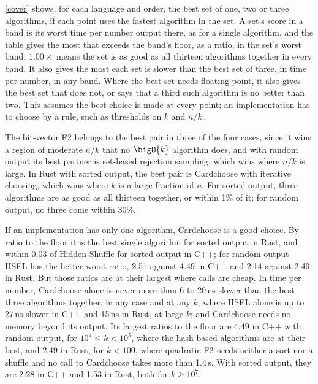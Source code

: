 \documentclass[letterpaper,11pt]{article}
\begin{document}
\autoref{cover} shows, for each language and
order, the best set of one, two or three algorithms, if each point uses
the fastest algorithm in the set. A set's score in a band is its worst
time per number output there, as for a single algorithm, and the table
gives the most that exceeds the band's floor, as a ratio, in the set's
worst band: \(1.00\times\) means the set is as good as all thirteen
algorithms together in every band. It also gives the most each set is
slower than the best set of three, in time per number, in any band.
Where the best set needs floating point, it also gives the best set
that does not, or says that a third such algorithm is no better than
two. This assumes the best choice is made at every point; an
implementation has to choose by a rule, such as thresholds on \(k\)
and \(n/k\).

\begin{table}
    \small
    
    \caption{The best sets of up to three algorithms, by how far their
    worst time per number output in a band of \(k\) exceeds the band's
    floor in their worst band, with the most they are slower than the
    best three in any band}\label{cover}
\end{table}

The bit-vector F2 belongs to the best pair in three of the four cases,
since it wins a region of moderate \(n/k\) that no \(\bigO{k}\)
algorithm does, and with random output its best partner is set-based
rejection sampling, which wins where \(n/k\) is large. In Rust with
sorted output, the best pair is Cardchoose with iterative choosing,
which wins where \(k\) is a large fraction of \(n\). For sorted output,
three algorithms are as good as all thirteen together, or within 1\% of
it; for random output, no three come within 30\%.

If an implementation has only one algorithm, Cardchoose is a good
choice. By ratio to the floor it is the best single algorithm for
sorted output in Rust, and within 0.03 of Hidden Shuffle for sorted
output in C++; for random output HSEL has the better worst ratio, 2.51
against 4.49 in C++ and 2.14 against 2.49 in Rust. But those ratios are
at their largest where calls are cheap. In time per number, Cardchoose
alone is never more than 6 to 20\,ns slower than the best three
algorithms together, in any case and at any \(k\), where HSEL alone is
up to 27\,ns slower in C++ and 15\,ns in Rust, at large \(k\); and
Cardchoose needs no memory beyond its output. Its largest ratios to the
floor are 4.49 in C++ with random output, for \(10^4 \leq k < 10^5\),
where the hash-based algorithms are at their best, and 2.49 in Rust,
for \(k < 100\), where quadratic F2 needs neither a sort nor a shuffle
and no call to Cardchoose takes more than 1.4\,\textmu s. With sorted
output, they are 2.28 in C++ and 1.53 in Rust, both for
\(k \geq 10^7\).
\end{document}
